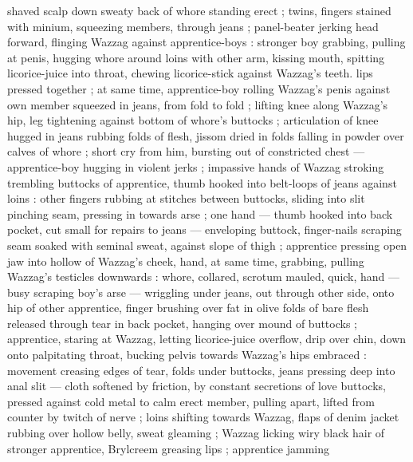 shaved scalp down sweaty back of whore standing erect ; twins, fingers stained with minium, squeezing members, through jeans ; panel-beater jerking head forward, flinging Wazzag against apprentice-boys : stronger boy grabbing, pulling at penis, hugging whore around loins with other arm, kissing mouth, spitting licorice-juice into throat, chewing licorice-stick against Wazzag's teeth. lips pressed together ; at same time, apprentice-boy rolling Wazzag's penis against own member squeezed in jeans, from fold to fold ; lifting knee along Wazzag's hip, leg tightening against bottom of whore's buttocks ; articulation of knee hugged in jeans rubbing folds of flesh, jissom dried in folds falling in powder over calves of whore ; short cry from him, bursting out of constricted chest --- apprentice-boy hugging in violent jerks ; impassive hands of Wazzag stroking trembling buttocks of apprentice, thumb hooked into belt-loops of jeans against loins : other fingers rubbing at stitches between buttocks, sliding into slit pinching seam, pressing in towards arse ; one hand --- thumb hooked into back pocket, cut small for repairs to jeans --- enveloping buttock, finger-nails scraping seam soaked with seminal sweat, against slope of thigh ; apprentice pressing open jaw into hollow of Wazzag's cheek, hand, at same time, grabbing, pulling Wazzag's testicles downwards : whore, collared, scrotum mauled, quick, hand --- busy scraping boy's arse --- wriggling under jeans, out through other side, onto hip of other apprentice, finger brushing over fat in olive folds of bare flesh released through tear in back pocket, hanging over mound of buttocks ; apprentice, staring at Wazzag, letting licorice-juice overflow, drip over chin, down onto palpitating throat, bucking pelvis towards Wazzag's hips embraced : movement creasing edges of tear, folds under buttocks, jeans pressing deep into anal slit --- cloth softened by friction, by constant secretions of love {\dashcom} buttocks, pressed against cold metal to calm erect member, pulling apart, lifted from counter by twitch of nerve ; loins shifting towards Wazzag, flaps of denim jacket rubbing over hollow belly, sweat gleaming ; Wazzag licking wiry black hair of stronger apprentice, Brylcreem greasing lips ; apprentice jamming 
